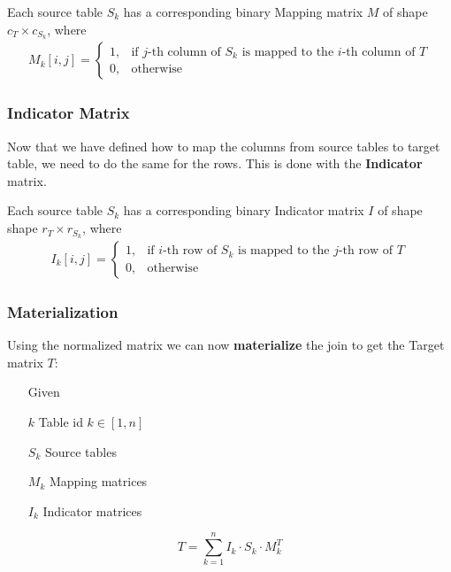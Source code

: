 \begin{definition} 
Each source table $S_k$ has a corresponding binary Mapping matrix $M$ of shape $c_T \times c_{S_k}$, where
\begin{align*}
    M_k[i,j] = \begin{cases}
    1, & \text{if $j$-th column of $S_k$ is mapped to the $i$-th column of $T$}\\
    0, & \text{otherwise}
\end{cases}
\end{align*}
\end{definition}


\subsubsection{Indicator Matrix}
Now that we have defined how to map the columns from source tables to target table, we need to do the same for the rows. This is done with the \textbf{Indicator} matrix.

\begin{definition}
Each source table $S_k$ has a corresponding binary Indicator matrix $I$ of shape shape $r_T \times r_{S_k}$, where
\begin{align*}
    I_k[i,j] = \begin{cases}
    1, & \text{if $i$-th row of $S_k$ is mapped to the $j$-th row of $T$}\\
    0, & \text{otherwise}
\end{cases}
\end{align*}
\end{definition}



\subsubsection{Materialization}
Using the normalized matrix we can now \textbf{materialize} the join to get the Target matrix $T$:

\begin{definition}
\begin{itemize}
    \item[]
    \item[] Given
    \item[$k$] Table id $k \in [1,n]$
    \item[$S_k$] Source tables
    \item[$M_k$] Mapping matrices
    \item[$I_k$] Indicator matrices
\end{itemize}
\[
T = \sum_{k=1}^{n}  I_k \cdot S_k \cdot M^T_k
\]

\end{definition}

